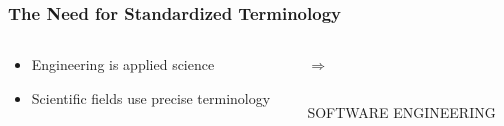 \documentclass{beamer}
\begin{document}
\begin{frame}
    \frametitle{The Need for Standardized Terminology}
    \begin{columns}[T]
        \begin{column}{.6\textwidth}
            \begin{itemize}
                \item Engineering is applied science
                \item Scientific fields use precise terminology
            \end{itemize}
        \end{column}
        \begin{column}{.4\textwidth}
            \begin{column}{.3\textwidth}
                \begin{center}
                    \vspace*{\fill}
                    \vspace{2mm}
                    \huge \textbf{$\Rightarrow$}
                    \vspace*{\fill}
                \end{center}
            \end{column}
            \begin{column}{.7\textwidth}
                \vspace{-1mm}
                \begin{block}{}{
                        \begin{center}
                            SOFTWARE ENGINEERING
                        \end{center}
                    }
                \end{block}
            \end{column}
        \end{column}
    \end{columns}
    \pause
    \vspace{5mm}
    \begin{columns}[b]
        \begin{column}{.3\textwidth}
            \begin{figure}

\end{figure}
\end{column}
\end{columns}
\end{frame}
\end{document}
